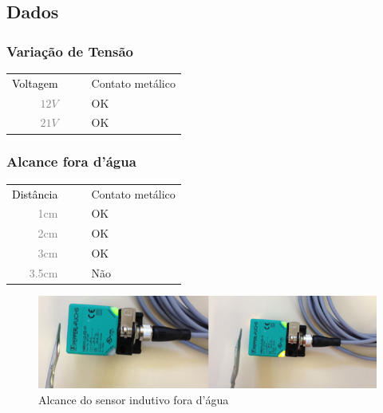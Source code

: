 

\subsection{Dados}
\subsubsection{Variação de Tensão}
\begin{table}[h!]
	\begin{tabular}{r l|l p{12cm} }
		\textcolor{black}{Voltagem} &&& 	{Contato metálico}\\
		\textcolor{gray}{$12V$} &&& 				{OK}\\
		\textcolor{gray}{$21V$} &&& 				{OK}\\
 	\end{tabular}
\end{table}

\subsubsection{Alcance fora d'água}
\begin{table}[h!]
	\begin{tabular}{r l|l p{12cm} }
		\textcolor{black}{Distância} &&& 	{Contato metálico}\\
		\textcolor{gray}{1cm} &&& 				{OK}\\
		\textcolor{gray}{2cm} &&& 				{OK}\\
		\textcolor{gray}{3cm} &&& 				{OK}\\
		\textcolor{gray}{3.5cm} &&& 				{Não}\\
 	\end{tabular}
\end{table}

\begin{figure}[H]
 \centering
 \includegraphics[width=1\columnwidth]{indutivo/figs/indutivo_alcance.png}
 \caption{Alcance do sensor indutivo fora d'água}
 \label{fig:indu_alc}
 \end{figure}
 
